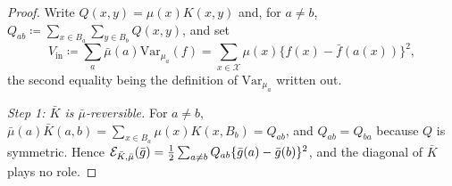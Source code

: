 \documentclass[aos]{imsart}%
\newcommand{\ambientspace}[0]{\mathcal{X}}
\newcommand{\Var}{\mathrm{Var}}
\theoremstyle{plain}
\theoremstyle{definition}
\begin{document}
    \begin{proof}
        Write $Q(x,y)=\mu(x)K(x,y)$ and, for $a\neq b$,
        $Q_{ab}\coloneq\sum_{x\in B_a}\sum_{y\in B_b}Q(x,y)$, and set
        \begin{equation*}
            V_{\mathrm{in}}\coloneq\sum_{a}\bar\mu(a)\Var_{\mu_a}(f)
            =\sum_{x\in\ambientspace}\mu(x)\{f(x)-\bar f(a(x))\}^{2},
        \end{equation*}
        the second equality being the definition of $\Var_{\mu_a}$ written out.

        \emph{Step 1: $\bar K$ is $\bar\mu$-reversible.} For $a\neq b$,
        $\bar\mu(a)\bar K(a,b)=\sum_{x\in B_a}\mu(x)K(x,B_b)=Q_{ab}$, and
        $Q_{ab}=Q_{ba}$ because $Q$ is symmetric. Hence
        $\mathcal{E}_{\bar K,\bar\mu}(\bar g)
        =\tfrac12\sum_{a\neq b}Q_{ab}\{\bar g(a)-\bar g(b)\}^{2}$, and the
        diagonal of $\bar K$ plays no role.


\end{proof}
\end{document}
